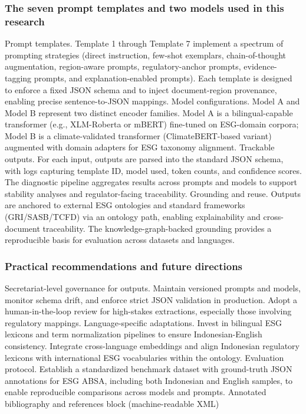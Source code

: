 \subsubsection{The seven prompt templates and two models used in this research}

Prompt templates. Template 1 through Template 7 implement a spectrum of prompting strategies (direct instruction, few-shot exemplars, chain-of-thought augmentation, region-aware prompts, regulatory-anchor prompts, evidence-tagging prompts, and explanation-enabled prompts). Each template is designed to enforce a fixed JSON schema and to inject document-region provenance, enabling precise sentence-to-JSON mappings.
Model configurations. Model A and Model B represent two distinct encoder families. Model A is a bilingual-capable transformer (e.g., XLM-Roberta or mBERT) fine-tuned on ESG-domain corpora; Model B is a climate-validated transformer (ClimateBERT-based variant) augmented with domain adapters for ESG taxonomy alignment.
Trackable outputs. For each input, outputs are parsed into the standard JSON schema, with logs capturing template ID, model used, token counts, and confidence scores. The diagnostic pipeline aggregates results across prompts and models to support stability analyses and regulator-facing traceability.
Grounding and reuse. Outputs are anchored to external ESG ontologies and standard frameworks (GRI/SASB/TCFD) via an ontology path, enabling explainability and cross-document traceability. The knowledge-graph-backed grounding provides a reproducible basis for evaluation across datasets and languages.
\subsubsection{Practical recommendations and future directions}

Secretariat-level governance for outputs. Maintain versioned prompts and models, monitor schema drift, and enforce strict JSON validation in production. Adopt a human-in-the-loop review for high-stakes extractions, especially those involving regulatory mappings.
Language-specific adaptations. Invest in bilingual ESG lexicons and term normalization pipelines to ensure Indonesian-English consistency. Integrate cross-language embeddings and align Indonesian regulatory lexicons with international ESG vocabularies within the ontology.
Evaluation protocol. Establish a standardized benchmark dataset with ground-truth JSON annotations for ESG ABSA, including both Indonesian and English samples, to enable reproducible comparisons across models and prompts.
Annotated bibliography and references block (machine-readable XML)

